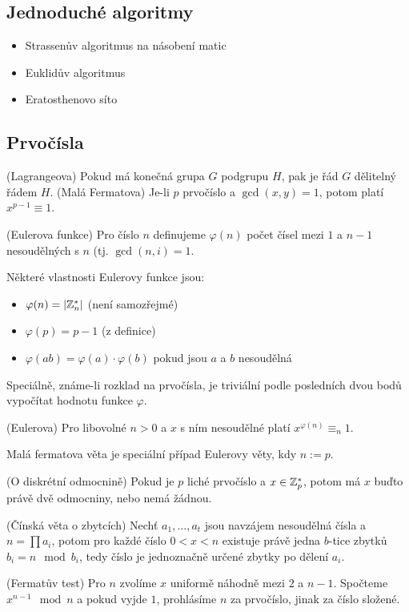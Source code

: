 \subsection{Jednoduché algoritmy}
\begin{itemize}
	\item Strassenův algoritmus na násobení matic
	\item Euklidův algoritmus
	\item Eratosthenovo síto
\end{itemize}
\subsection{Prvočísla}

\vt (Lagrangeova) Pokud má konečná grupa $G$ podgrupu $H$, pak je řád $G$
dělitelný řádem $H$.
\vt (Malá Fermatova) Je-li $p$ prvočíslo a $\gcd(x,y) = 1$, potom platí $x^{p-1}
\equiv 1$.

\df (Eulerova funkce) Pro číslo $n$ definujeme $\varphi(n)$ počet čísel mezi $1$
a $n-1$ nesoudělných s $n$ (tj. $\gcd(n,i) = 1$.

\poz Některé vlastnosti Eulerovy funkce jsou:
\begin{itemize}
	\item $\varphi(n) = |\mathbb{Z}_n^*|$ (není samozřejmé)
	\item $\varphi(p) = p-1$ (z definice)
	\item $\varphi(ab) = \varphi(a) \cdot \varphi(b)$ pokud jsou $a$ a $b$
		nesoudělná
\end{itemize}
Speciálně, známe-li rozklad na prvočísla, je triviální podle posledních dvou
bodů vypočítat hodnotu funkce $\varphi$.

\vt (Eulerova) Pro libovolné $n > 0$ a $x$ s ním nesoudělné platí
$x^{\varphi(n)} \equiv_n 1$.

\poz Malá fermatova věta je speciální případ Eulerovy věty, kdy $n := p$.

\vt (O diskrétní odmocnině) Pokud je $p$ liché prvočíslo a $x \in \mathbb{Z}_p^*$, potom
má $x$ buďto právě dvě odmocniny, nebo nemá žádnou.

\vt (Čínská věta o zbytcích) Nechť $a_1, \dots, a_t$ jsou navzájem nesoudělná
čísla a $n = \prod a_i$, potom pro každé číslo $0 < x < n$ existuje právě jedna
$b$-tice zbytků $b_i = n \mod b_i$, tedy číslo je jednoznačně určené zbytky po
dělení $a_i$.

\alg (Fermatův test) Pro $n$ zvolíme $x$ uniformě náhodně mezi $2$ a $n-1$.
Spočteme $x^{n-1} \mod n$ a pokud vyjde $1$, prohlásíme $n$ za prvočíslo, jinak
za číslo složené.

